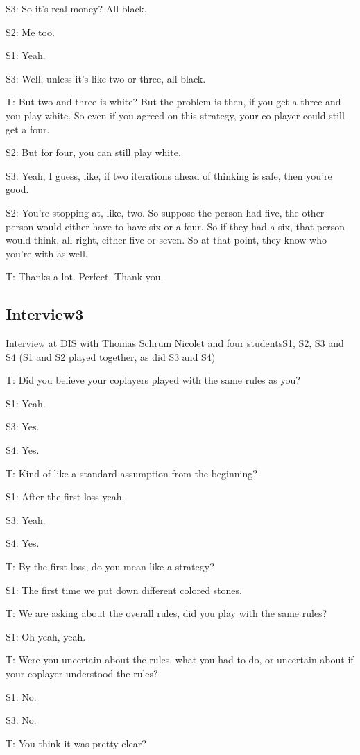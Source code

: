 \documentclass[a4paper,superscriptaddress,nofootinbib]{revtex4}
\begin{document}
S3: So it's real money? All black. 

S2: Me too.

S1: Yeah. 

S3: Well, unless it's like two or three, all black.

T: But two and three is white? But the problem is then, if you get a three and you play white. So even if you agreed on this strategy, your co-player could still get a four.

S2: But for four, you can still play white.

S3: Yeah, I guess, like, if two iterations ahead of thinking is safe, then you're good. 

S2: You're stopping at, like, two. So suppose the person had five, the other person would either have to have six or a four. So if they had a six, that person would think, all right, either five or seven. So at that point, they know who you're with as well. 

T: Thanks a lot. Perfect. Thank you.


\subsection*{Interview3}
Interview at DIS with Thomas Schrum Nicolet and four studentsS1, S2, S3 and S4 (S1 and S2 played together, as did S3 and S4)

T: Did you believe your coplayers played with the same rules as you?

S1: Yeah.

S3: Yes.

S4: Yes.

T: Kind of like a standard assumption from the beginning?

S1: After the first loss yeah.

S3: Yeah.

S4: Yes.

T: By the first loss, do you mean like a strategy?

S1: The first time we put down different colored stones.

T: We are asking about the overall rules, did you play with the same rules?

S1: Oh yeah, yeah.

T: Were you uncertain about the rules, what you had to do, or uncertain about if your coplayer understood the rules?

S1: No.

S3: No.

T: You think it was pretty clear?
\end{document}

